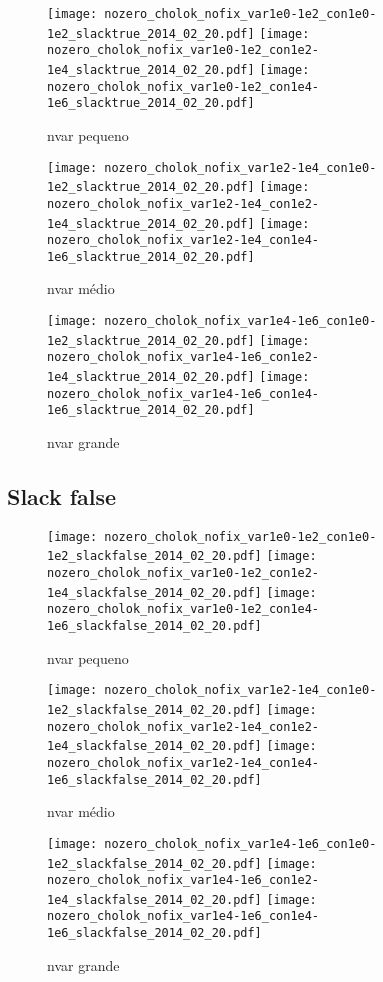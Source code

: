\documentclass{article}
\begin{document}
\begin{figure}[H]
  \centering
  \texttt{[image: nozero\_cholok\_nofix\_var1e0-1e2\_con1e0-1e2\_slacktrue\_2014\_02\_20.pdf]}
  \texttt{[image: nozero\_cholok\_nofix\_var1e0-1e2\_con1e2-1e4\_slacktrue\_2014\_02\_20.pdf]}
  \texttt{[image: nozero\_cholok\_nofix\_var1e0-1e2\_con1e4-1e6\_slacktrue\_2014\_02\_20.pdf]}
  \caption{ nvar pequeno }
\end{figure}
\begin{figure}[H]
  \centering
  \texttt{[image: nozero\_cholok\_nofix\_var1e2-1e4\_con1e0-1e2\_slacktrue\_2014\_02\_20.pdf]}
  \texttt{[image: nozero\_cholok\_nofix\_var1e2-1e4\_con1e2-1e4\_slacktrue\_2014\_02\_20.pdf]}
  \texttt{[image: nozero\_cholok\_nofix\_var1e2-1e4\_con1e4-1e6\_slacktrue\_2014\_02\_20.pdf]}
  \caption{ nvar médio }
\end{figure}
\begin{figure}[H]
  \centering
  \texttt{[image: nozero\_cholok\_nofix\_var1e4-1e6\_con1e0-1e2\_slacktrue\_2014\_02\_20.pdf]}
  \texttt{[image: nozero\_cholok\_nofix\_var1e4-1e6\_con1e2-1e4\_slacktrue\_2014\_02\_20.pdf]}
  \texttt{[image: nozero\_cholok\_nofix\_var1e4-1e6\_con1e4-1e6\_slacktrue\_2014\_02\_20.pdf]}
  \caption{ nvar grande }
\end{figure}

\newpage
\subsection{Slack false}

\begin{figure}[H]
  \centering
  \texttt{[image: nozero\_cholok\_nofix\_var1e0-1e2\_con1e0-1e2\_slackfalse\_2014\_02\_20.pdf]}
  \texttt{[image: nozero\_cholok\_nofix\_var1e0-1e2\_con1e2-1e4\_slackfalse\_2014\_02\_20.pdf]}
  \texttt{[image: nozero\_cholok\_nofix\_var1e0-1e2\_con1e4-1e6\_slackfalse\_2014\_02\_20.pdf]}
  \caption{ nvar pequeno }
\end{figure}
\begin{figure}[H]
  \centering
  \texttt{[image: nozero\_cholok\_nofix\_var1e2-1e4\_con1e0-1e2\_slackfalse\_2014\_02\_20.pdf]}
  \texttt{[image: nozero\_cholok\_nofix\_var1e2-1e4\_con1e2-1e4\_slackfalse\_2014\_02\_20.pdf]}
  \texttt{[image: nozero\_cholok\_nofix\_var1e2-1e4\_con1e4-1e6\_slackfalse\_2014\_02\_20.pdf]}
  \caption{ nvar médio }
\end{figure}
\begin{figure}[H]
  \centering
  \texttt{[image: nozero\_cholok\_nofix\_var1e4-1e6\_con1e0-1e2\_slackfalse\_2014\_02\_20.pdf]}
  \texttt{[image: nozero\_cholok\_nofix\_var1e4-1e6\_con1e2-1e4\_slackfalse\_2014\_02\_20.pdf]}
  \texttt{[image: nozero\_cholok\_nofix\_var1e4-1e6\_con1e4-1e6\_slackfalse\_2014\_02\_20.pdf]}
  \caption{ nvar grande }
\end{figure}
\end{document}
